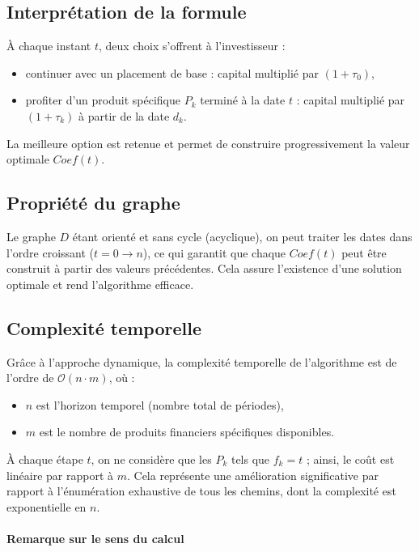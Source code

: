 \documentclass[a4paper,11pt]{article}
\begin{document}
\subsection{Interprétation de la formule}

À chaque instant $t$, deux choix s’offrent à l’investisseur :
\begin{itemize}
    \item continuer avec un placement de base : capital multiplié par $(1 + \tau_0)$,
    \item profiter d’un produit spécifique $P_k$ terminé à la date $t$ : capital multiplié par $(1 + \tau_k)$ à partir de la date $d_k$.
\end{itemize}

La meilleure option est retenue et permet de construire progressivement la valeur optimale $Coef(t)$.

\subsection{Propriété du graphe}

Le graphe $D$ étant orienté et sans cycle (acyclique), on peut traiter les dates dans l’ordre croissant ($t = 0 \to n$), ce qui garantit que chaque $Coef(t)$ peut être construit à partir des valeurs précédentes. Cela assure l’existence d’une solution optimale et rend l’algorithme efficace.

    \subsection{Complexité temporelle}

    Grâce à l’approche dynamique, la complexité temporelle de l’algorithme est de l’ordre de $\mathcal{O}(n \cdot m)$, où :
    \begin{itemize}
        \item $n$ est l’horizon temporel (nombre total de périodes),
        \item $m$ est le nombre de produits financiers spécifiques disponibles.
    \end{itemize}

    À chaque étape $t$, on ne considère que les $P_k$ tels que $f_k = t$ ; ainsi, le coût est linéaire par rapport à $m$. Cela représente une amélioration significative par rapport à l’énumération exhaustive de tous les chemins, dont la complexité est exponentielle en $n$.

    \paragraph{Remarque sur le sens du calcul}
\end{document}
